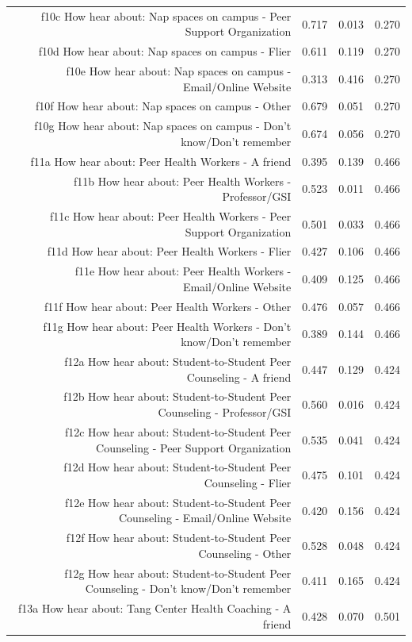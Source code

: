 \documentclass{article}\usepackage[]{graphicx}\usepackage[]{color}
\begin{document}
\begin{table}[H]
{\begin{tabular}{rrrr}
  f10c How hear about: Nap spaces on campus - Peer Support Organization & 0.717 & 0.013 & 0.270 \\ 
  f10d How hear about: Nap spaces on campus - Flier & 0.611 & 0.119 & 0.270 \\ 
  f10e How hear about: Nap spaces on campus - Email/Online Website & 0.313 & 0.416 & 0.270 \\ 
  f10f How hear about: Nap spaces on campus - Other & 0.679 & 0.051 & 0.270 \\ 
  f10g How hear about: Nap spaces on campus - Don't know/Don't remember & 0.674 & 0.056 & 0.270 \\ 
  f11a How hear about: Peer Health Workers - A friend & 0.395 & 0.139 & 0.466 \\ 
  f11b How hear about: Peer Health Workers - Professor/GSI & 0.523 & 0.011 & 0.466 \\ 
  f11c How hear about: Peer Health Workers - Peer Support Organization & 0.501 & 0.033 & 0.466 \\ 
  f11d How hear about: Peer Health Workers - Flier & 0.427 & 0.106 & 0.466 \\ 
  f11e How hear about: Peer Health Workers - Email/Online Website & 0.409 & 0.125 & 0.466 \\ 
  f11f How hear about: Peer Health Workers - Other & 0.476 & 0.057 & 0.466 \\ 
  f11g How hear about: Peer Health Workers - Don't know/Don't remember & 0.389 & 0.144 & 0.466 \\ 
  f12a How hear about: Student-to-Student Peer Counseling - A friend & 0.447 & 0.129 & 0.424 \\ 
  f12b How hear about: Student-to-Student Peer Counseling - Professor/GSI & 0.560 & 0.016 & 0.424 \\ 
  f12c How hear about: Student-to-Student Peer Counseling - Peer Support Organization & 0.535 & 0.041 & 0.424 \\ 
  f12d How hear about: Student-to-Student Peer Counseling - Flier & 0.475 & 0.101 & 0.424 \\ 
  f12e How hear about: Student-to-Student Peer Counseling - Email/Online Website & 0.420 & 0.156 & 0.424 \\ 
  f12f How hear about: Student-to-Student Peer Counseling - Other & 0.528 & 0.048 & 0.424 \\ 
  f12g How hear about: Student-to-Student Peer Counseling - Don't know/Don't remember & 0.411 & 0.165 & 0.424 \\ 
  f13a How hear about: Tang Center Health Coaching - A friend & 0.428 & 0.070 & 0.501 \\ 

\end{tabular}}
\end{table}
\end{document}
